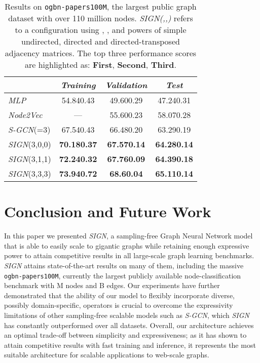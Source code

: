\documentclass{article}
\begin{document}
\begin{table}[t]
    \centering
    \caption{Results on \texttt{ogbn-papers100M}, the largest public graph dataset with over 110 million nodes. {\em SIGN(,,)} refers to a configuration using , , and  powers of simple undirected, directed and directed-transposed adjacency matrices. The top three performance scores are highlighted as: {\bf \color{red} First}, {\bf \color{violet} Second}, {\bf Third}.}
    \label{tab:ogbn-100m}
    \begin{tabular}{| l | ccc |}
        \hline
        & \textit{Training} & \textit{Validation} & \textit{Test} \\
        \hline
        \textit{MLP}
            & 54.840.43
            & 49.600.29
            & 47.240.31 \\
        \textit{Node2Vec}
            & ---
            & 55.600.23
            & 58.070.28 \\
        \textit{S-GCN}(=3)
            & 67.540.43
            & 66.480.20
            & 63.290.19 \\
        \hline
        \textit{SIGN}(3,0,0)
            & \textbf{70.180.37}
            & \textbf{67.570.14}
            & \textbf{64.280.14}\\
        \textit{SIGN}(3,1,1)
            & \textbf{\color{violet} 72.240.32}
            & \textbf{\color{violet} 67.760.09}
            & \textbf{\color{violet} 64.390.18 }\\
        \textit{SIGN}(3,3,3)
            & \textbf{\color{red} 73.940.72}
            & \textbf{\color{red} 68.60.04}
            & \textbf{\color{red} 65.110.14} \\
        \hline
    \end{tabular} 
\end{table}


\section{Conclusion and Future Work} \label{sec:conclusion}
 
In this paper we presented \textit{SIGN}, a sampling-free Graph Neural Network model that is able to easily scale to gigantic graphs while retaining enough expressive power to attain competitive results in all large-scale graph learning benchmarks. \textit{SIGN} attains state-of-the-art results on many of them, including the massive \texttt{ogbn-papers100M}, currently the largest  publicly available node-classification benchmark  with M nodes and B edges.
Our experiments have further demonstrated that the ability of our model to flexibly incorporate diverse, possibly domain-specific, operators is crucial to overcome the expressivity limitations of other sampling-free scalable models such as \textit{S-GCN}, which \textit{SIGN} has constantly outperformed over all datasets.
Overall, our architecture achieves an optimal trade-off between simplicity and expressiveness; as it has shown to attain competitive results with fast training and inference, it represents the most suitable architecture for scalable applications to web-scale graphs.
\end{document}
